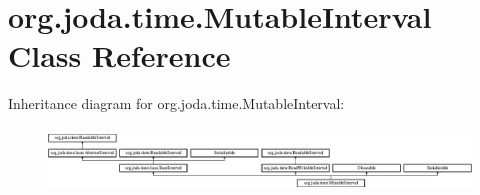 \hypertarget{classorg_1_1joda_1_1time_1_1_mutable_interval}{\section{org.\-joda.\-time.\-Mutable\-Interval Class Reference}
\label{classorg_1_1joda_1_1time_1_1_mutable_interval}
}
Inheritance diagram for org.\-joda.\-time.\-Mutable\-Interval\-:\begin{figure}[H]
\begin{center}
\leavevmode
\includegraphics[height=1.720430cm]{classorg_1_1joda_1_1time_1_1_mutable_interval}
\end{center}
\end{figure}
